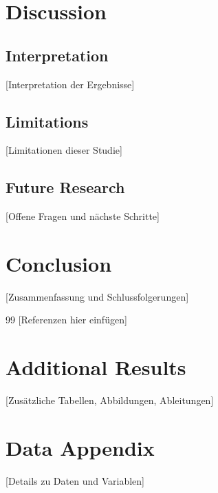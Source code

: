 \documentclass[12pt,a4paper]{article}
\begin{document}
\section{Discussion}

\subsection{Interpretation}

[Interpretation der Ergebnisse]

\subsection{Limitations}

[Limitationen dieser Studie]

\subsection{Future Research}

[Offene Fragen und nächste Schritte]

\section{Conclusion}

[Zusammenfassung und Schlussfolgerungen]

\newpage

% 

\begin{thebibliography}{99}
 [Referenzen hier einfügen]
\end{thebibliography}

\appendix
\newpage
\section{Additional Results}

[Zusätzliche Tabellen, Abbildungen, Ableitungen]

\section{Data Appendix}

[Details zu Daten und Variablen]
\end{document}
